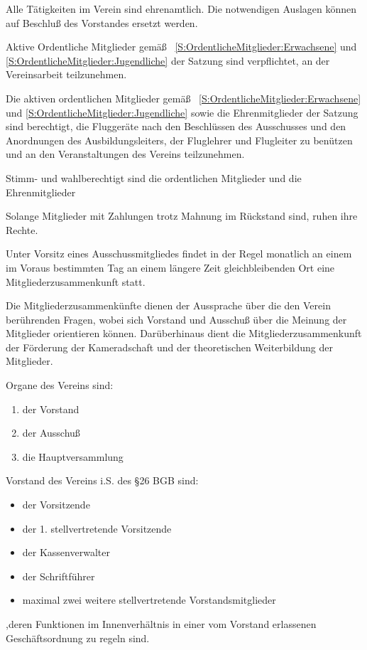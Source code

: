 \documentclass[10pt,a4paper,parskip=half]{scrartcl}
\begin{document}
\begin{contract}
\begin{multicols}{2}
\begin{enumerate}[label=\alph*),noitemsep]
    Alle Tätigkeiten im Verein sind ehrenamtlich.
    Die notwendigen Auslagen können auf Beschluß des Vorstandes ersetzt werden.
    
    Aktive Ordentliche Mitglieder gemäß ~\autoref{S:OrdentlicheMitglieder:Erwachsene} und \autoref{S:OrdentlicheMitglieder:Jugendliche} der Satzung sind verpflichtet,
    an der Vereinsarbeit teilzunehmen.
    
    
    Die aktiven ordentlichen Mitglieder gemäß ~\autoref{S:OrdentlicheMitglieder:Erwachsene} und \autoref{S:OrdentlicheMitglieder:Jugendliche}
    sowie die Ehrenmitglieder der Satzung sind berechtigt,
    die Fluggeräte nach den Beschlüssen des Ausschusses und den Anordnungen des Ausbildungsleiters,
    der Fluglehrer und Flugleiter zu benützen und an den Veranstaltungen des Vereins teilzunehmen.
    
    Stimm- und wahlberechtigt sind die ordentlichen Mitglieder und die Ehrenmitglieder
    
    Solange Mitglieder mit Zahlungen trotz Mahnung im Rückstand sind,
    ruhen ihre Rechte.
    
    Unter Vorsitz eines Ausschussmitgliedes findet in der Regel monatlich an einem im Voraus bestimmten Tag an einem längere Zeit gleichbleibenden Ort eine Mitgliederzusammenkunft statt.
    
    Die Mitgliederzusammenkünfte dienen der Aussprache über die den Verein berührenden Fragen,
    wobei sich Vorstand und Ausschuß über die Meinung der Mitglieder orientieren können.
    Darüberhinaus dient die Mitgliederzusammenkunft der Förderung der Kameradschaft und der theoretischen Weiterbildung der Mitglieder.
    
    Organe des Vereins sind:
    \begin{enumerate}[noitemsep]
      \item der Vorstand
      \item der Ausschuß
      \item die Hauptversammlung
    \end{enumerate}
    
    \label{C:Vorstand}
    Vorstand des Vereins i.S. des §26 BGB sind:
    \begin{itemize}[noitemsep]
      \item der Vorsitzende
      \item der 1. stellvertretende Vorsitzende
      \item der Kassenverwalter
      \item der Schriftführer
      \item maximal zwei weitere stellvertretende Vorstandsmitglieder
    \end{itemize}
    ,deren Funktionen im Innenverhältnis in einer vom Vorstand erlassenen Geschäftsordnung zu regeln sind.
    

\end{enumerate}
\end{multicols}
\end{contract}
\end{document}

